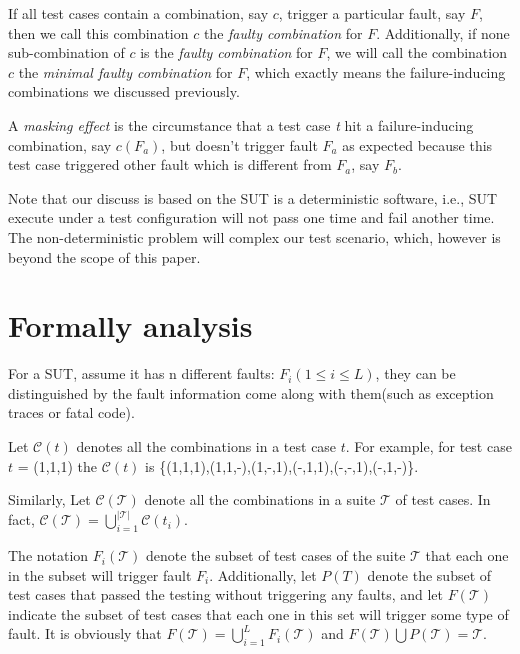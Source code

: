 \documentclass{sig-alternate}
\begin{document}
\begin{definition}
If all test cases contain a combination, say $c$, trigger a particular fault, say $F$, then we call this combination $c$ the \emph{faulty combination} for $F$. Additionally, if none sub-combination of $c$ is the \emph{faulty combination} for $F$, we will call the combination $c$ the \emph{minimal faulty combination} for $F$, which exactly means the failure-inducing combinations we discussed previously.

\end{definition}

\begin{definition}
A \emph{masking effect} is the circumstance that a test case \emph{t} hit a failure-inducing combination, say $c(F_{a})$, but doesn't trigger fault $F_{a}$ as expected because this test case triggered other fault which is different from $F_{a}$, say $F_{b}$. 

\end{definition}

Note that our discuss is based on the SUT is a deterministic software, i.e., SUT execute under a test configuration will not pass one time and fail another time. The non-deterministic problem will complex our test scenario, which, however is beyond the scope of this paper.


\section{Formally analysis}
For a SUT, assume it has n different faults: $F_{i} ( 1 \leq i \leq L)$, they can be distinguished by the fault information come along with them(such as exception traces or fatal code). 

Let $\mathcal{C}(t)$ denotes all the combinations in a test case $t$. For example, for test case $t$ = (1,1,1) the  $\mathcal{C}(t)$ is \{(1,1,1),(1,1,-),(1,-,1),(-,1,1),(-,-,1),(-,1,-)\}.

Similarly, Let $\mathcal{C}(\mathcal{T})$ denote all the combinations in a suite $\mathcal{T}$ of test cases. In fact, $\mathcal{C}(\mathcal{T}) = \bigcup_{i = 1}^{|\mathcal{T}|}\mathcal{C}(t_{i})$. 

The notation $F_{i}(\mathcal{T})$  denote the subset of test cases of the suite $\mathcal{T}$ that each one in the subset will trigger fault $F_{i}$.  Additionally, let $P(T)$ denote the subset of test cases that passed the testing without triggering any faults, and let $F(\mathcal{T})$ indicate the subset of test cases that each one in this set will trigger some type of fault. It is obviously that $F(\mathcal{T}) =  \bigcup_{i = 1}^{L}F_{i}(\mathcal{T})$ and $F(\mathcal{T})\bigcup P(\mathcal{T}) = \mathcal{T}$.
\end{document}
